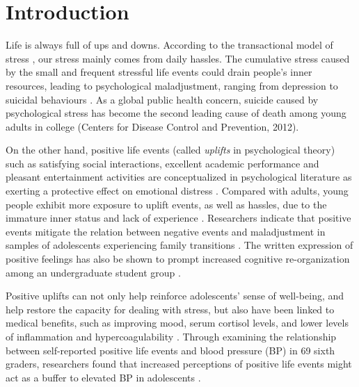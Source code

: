 \section{Introduction}
Life is always full of ups and downs.
According to the transactional model of stress \cite{Susan1984Stress}, our stress mainly comes from daily hassles.
The cumulative stress caused by the small and frequent stressful life events could drain people's inner resources,
leading to psychological maladjustment, ranging from depression to suicidal behaviours \cite{Nock2008Suicide}.
As a global public health concern,
suicide caused by psychological stress has become the second leading cause of death among young adults in college
(Centers for Disease Control and Prevention, 2012).

On the other hand, positive life events (called \emph{uplifts} in psychological theory) such as satisfying social interactions,
excellent academic performance and pleasant entertainment activities are conceptualized in psychological literature as exerting a protective effect on emotional distress \cite{Cohen1984Positive} \cite{Cohen2010Positive} \cite{Needles1990Positive}.
Compared with adults, young people exhibit more exposure to uplift events, as well as hassles,
due to the immature inner status and lack of experience \cite{older}.
Researchers indicate that positive events mitigate the relation between negative events and maladjustment in samples of adolescents experiencing family transitions \cite{Doyle2003Positive}.
The written expression of positive feelings has also be shown to prompt increased cognitive re-organization among an undergraduate student group \cite{Coolidge2009A}.

Positive uplifts can not only help reinforce adolescents' sense of well-being,
and help restore the capacity for dealing with stress,
but also have been linked to medical benefits, such as improving mood, serum cortisol levels, and lower levels of inflammation and hypercoagulability \cite{Jain2010Effects}.
Through examining the relationship between self-reported positive life events and blood pressure (BP) in 69 sixth graders,
researchers found that  increased perceptions of positive life events might act as a buffer to elevated BP in adolescents
\cite{Caputo1998Influence}.

